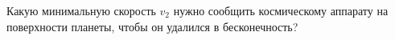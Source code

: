Какую минимальную скорость $v_2$ нужно сообщить космическому аппарату на
поверхности планеты, чтобы он удалился в бесконечность?
